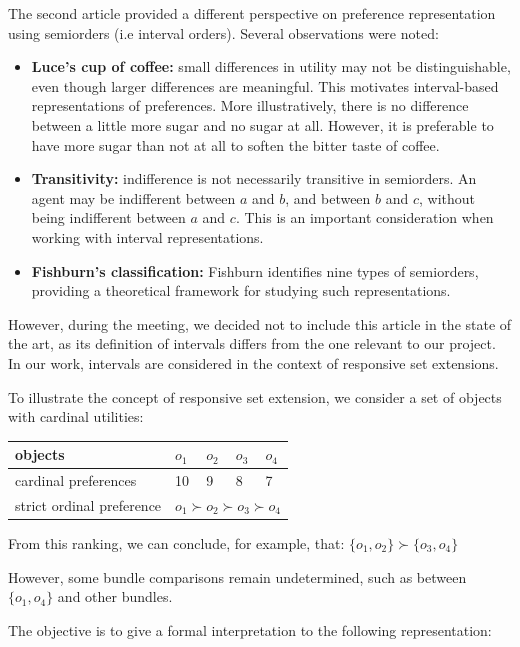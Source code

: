 \documentclass{article}
\begin{document}
The second article provided a different perspective on preference representation using semiorders (i.e interval orders). Several observations were noted:
\begin{itemize}
    \item \textbf{Luce's cup of coffee:} small differences in utility may not be distinguishable, even though larger differences are meaningful. This motivates interval-based representations of preferences. More illustratively, there is no difference between a little more sugar and no sugar at all. However, it is preferable to have more sugar than not at all to soften the bitter taste of coffee.
    \item \textbf{Transitivity:} indifference is not necessarily transitive in semiorders. An agent may be indifferent between $a$ and $b$, and between $b$ and $c$, without being indifferent between $a$ and $c$. This is an important consideration when working with interval representations.
    \item \textbf{Fishburn's classification:} Fishburn identifies nine types of semiorders, providing a theoretical framework for studying such representations.
\end{itemize}
However, during the meeting, we decided not to include this article in the state of the art, as its definition of intervals differs from the one relevant to our project. In our work, intervals are considered in the context of responsive set extensions.

To illustrate the concept of responsive set extension, we consider a set of objects with cardinal utilities:

\begin{tabular}{|p{5cm}|p{2cm}|p{2cm}|p{2cm}|p{2cm}|}
    \hline
    objects & $o_1$ & $o_2$ & $o_3$ & $o_4$ \\
    \hline
    cardinal preferences & 10 & 9 & 8 & 7 \\
    \hline
    strict ordinal preference & \multicolumn{4}{|c|}{ $o_1 \succ o_2 \succ o_3 \succ o_4$ } \\
\end{tabular}

From this ranking, we can conclude, for example, that: $\{o_1, o_2\} \succ \{o_3,o_4\}$

However, some bundle comparisons remain undetermined, such as between $\{o_1, o_4\}$ and other bundles.

The objective is to give a formal interpretation to the following representation:
\end{document}
